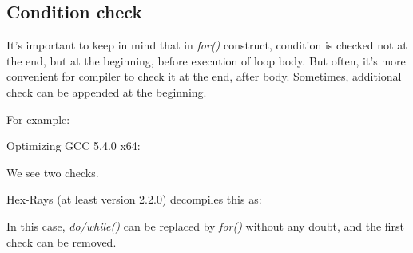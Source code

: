 \subsection{Condition check}

It's important to keep in mind that in \emph{for()} construct, condition is checked not at the end, but at the beginning, before execution of loop body.
But often, it's more convenient for compiler to check it at the end, after body.
Sometimes, additional check can be appended at the beginning.

For example:



Optimizing GCC 5.4.0 x64:



We see two checks.

Hex-Rays (at least version 2.2.0) decompiles this as:



In this case, \emph{do/while()} can be replaced by \emph{for()} without any doubt, and the first check can be removed.

